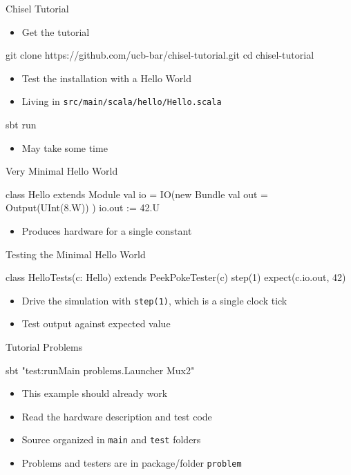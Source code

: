 \documentclass[xcolor=pdflatex,dvipsnames,table]{beamer}
\newcommand{\code}[1]{{\texttt{#1}}}
\begin{document}
\begin{frame}[fragile]{Chisel Tutorial}
\begin{itemize}
\item Get the tutorial
\end{itemize}
\begin{chisel}
git clone https://github.com/ucb-bar/chisel-tutorial.git
cd chisel-tutorial
\end{chisel}
\begin{itemize}
\item Test the installation with a Hello World
\item Living in \code{src/main/scala/hello/Hello.scala}
\end{itemize}
\begin{chisel}
sbt run
\end{chisel}
\begin{itemize}
\item May take some time
\end{itemize}
\end{frame}

\begin{frame}[fragile]{Very Minimal Hello World}
\begin{chisel}
class Hello extends Module {
  val io = IO(new Bundle {
    val out = Output(UInt(8.W))
  })
  io.out := 42.U
}
\end{chisel}
\begin{itemize}
\item Produces hardware for a single constant
\end{itemize}
\end{frame}

\begin{frame}[fragile]{Testing the Minimal Hello World}
\begin{chisel}
class HelloTests(c: Hello) extends PeekPokeTester(c) {
  step(1)
  expect(c.io.out, 42)
}
\end{chisel}
\begin{itemize}
\item Drive the simulation with \code{step(1)}, which is a single clock tick
\item Test output against expected value
\end{itemize}
\end{frame}

\begin{frame}[fragile]{Tutorial Problems}
\begin{chisel}
sbt "test:runMain problems.Launcher Mux2"
\end{chisel}
\begin{itemize}
\item This example should already work
\item Read the hardware description and test code
\item Source organized in \code{main} and \code{test} folders
\item Problems and testers are in package/folder \code{problem}
\end{itemize}
\end{frame}
\end{document}
